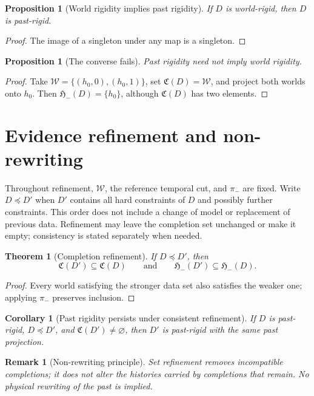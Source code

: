 \documentclass[11pt]{article}
\newtheorem{proposition}[definition]{Proposition}
\newtheorem{theorem}[definition]{Theorem}
\newtheorem{corollary}[definition]{Corollary}
\newtheorem{remark}[definition]{Remark}
\newcommand{\Wcal}{\mathcal W}
\newcommand{\Ccal}{\mathfrak C}
\newcommand{\Pcal}{\mathfrak H_-}
\begin{document}
\begin{proposition}[World rigidity implies past rigidity]
\label{prop:world-past}
If $D$ is world-rigid, then $D$ is past-rigid.
\end{proposition}
\begin{proof}
The image of a singleton under any map is a singleton.
\end{proof}

\begin{proposition}[The converse fails]
\label{prop:converse}
Past rigidity need not imply world rigidity.
\end{proposition}
\begin{proof}
Take $\Wcal=\{(h_0,0),(h_0,1)\}$, set $\Ccal(D)=\Wcal$,
and project both worlds onto $h_0$. Then $\Pcal(D)=\{h_0\}$,
although $\Ccal(D)$ has two elements.
\end{proof}

\section{Evidence refinement and non-rewriting}
Throughout refinement, $\Wcal$, the reference temporal cut, and $\pi_-$
are fixed. Write $D\preceq D'$ when $D'$ contains all hard constraints
of $D$ and possibly further constraints. This order does not include a
change of model or replacement of previous data. Refinement may leave
the completion set unchanged or make it empty; consistency is stated
separately when needed.
\begin{theorem}[Completion refinement]
\label{thm:completion-refinement}
If $D\preceq D'$, then
\[
\Ccal(D')\subseteq\Ccal(D)
\qquad\text{and}\qquad
\Pcal(D')\subseteq\Pcal(D).
\]
\end{theorem}
\begin{proof}
Every world satisfying the stronger data set also satisfies the weaker one; applying $\pi_-$ preserves inclusion.
\end{proof}
\begin{corollary}[Past rigidity persists under consistent refinement]
\label{cor:rigidity-persistence}
If $D$ is past-rigid, $D\preceq D'$, and $\Ccal(D')\neq\varnothing$, then $D'$ is past-rigid with the same past projection.
\end{corollary}
\begin{remark}[Non-rewriting principle]
Set refinement removes incompatible completions; it does not alter the histories carried by completions that remain. No physical rewriting of the past is implied.
\end{remark}
\end{document}
